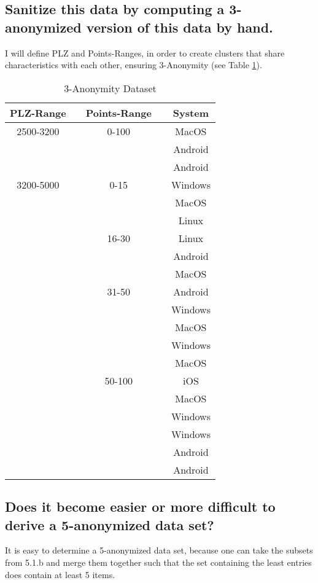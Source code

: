 \documentclass{report}
\begin{document}
\begin{adjustwidth}{-8em}{}
		\subsection{Sanitize this data by computing a 3-anonymized version of this data by hand.}
		\startsubsection
			I will define PLZ and Points-Ranges, in order to create clusters that share characteristics with each other, ensuring 3-Anonymity (see Table \ref{tab:3anonymDS}).
		\closesection
		\begin{table}\begin{center}
			\begin{tabular}{ccccc}
				\hline
				\textbf{PLZ-Range} && \textbf{Points-Range} && \textbf{System} \\
				\hline
				2500-3200 && 0-100 && MacOS \\
				&&&& Android \\
				&&&& Android \\
				\hline
				3200-5000 && 0-15 && Windows \\
				&&&& MacOS \\
				&&&& Linux \\
				\cmidrule{2-5}
				&& 16-30 && Linux \\
				&&&& Android \\
				&&&& MacOS \\
				\cmidrule{2-5}
				&& 31-50 && Android \\
				&&&& Windows \\
				&&&& MacOS \\
				&&&& Windows \\
				&&&& MacOS \\
				\cmidrule{2-5}
				&& 50-100 && iOS \\
				&&&& MacOS \\
				&&&& Windows \\
				&&&& Windows \\
				&&&& Android \\
				&&&& Android \\
				\hline
			\end{tabular}
		\caption{\label{tab:3anonymDS}3-Anonymity Dataset}
		\end{center}\end{table}
		\subsection{Does it become easier or more difficult to derive a 5-anonymized data set?}
		\startsubsection
			It is easy to determine a 5-anonymized data set, because one can take the subsets from 5.1.b and merge them together such that the set containing the least entries does contain at least 5 items.
		\closesection

\end{adjustwidth}
\end{document}
